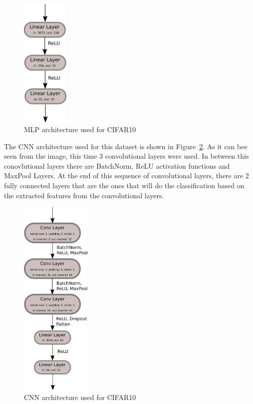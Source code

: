 \documentclass[english,preprint,JIP]{ipsj}
\begin{document}
\begin{figure}
    \centering
    \includegraphics[width=0.2\textwidth]{img/cifar_mlp.png}
    \caption{MLP architecture used for CIFAR10}
    \label{fig:cifar_mlp}
\end{figure}

The CNN architecture used for this dataset is shown in
Figure~\ref{fig:cifar_cnn}. As it can bee seen from the image, this time 3
convolutional layers were used. In between this conovlutional layers there are
BatchNorm, ReLU activation functions and MaxPool Layers. At the end of this
sequence of convolutional layers, there are 2 fully connected layers that are
the ones that will do the classification based on the extracted features from
the convolutional layers.\\

\begin{figure}
    \centering
    \includegraphics[width=0.3\textwidth]{img/cifar_cnn.png}
    \caption{CNN architecture used for CIFAR10}
    \label{fig:cifar_cnn}
\end{figure}
\end{document}
